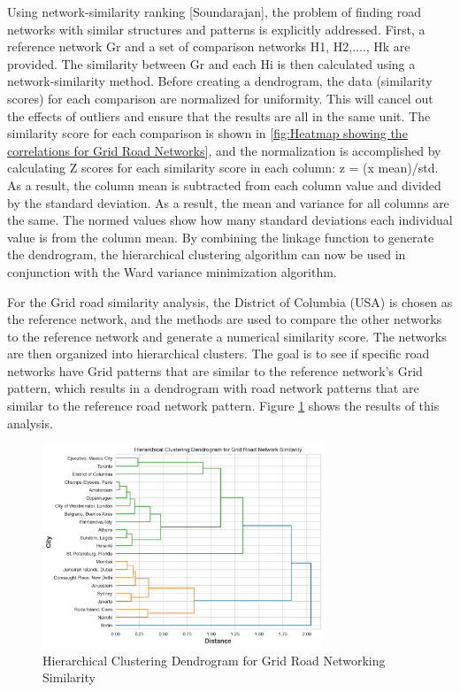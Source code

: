 Using network-similarity ranking [Soundarajan], the problem of finding road networks with similar structures and patterns is explicitly addressed. First, a reference network Gr and a set of comparison networks H1, H2,...., Hk are provided. The similarity between Gr and each Hi is then calculated using a network-similarity method. Before creating a dendrogram, the data (similarity scores) for each comparison are normalized for uniformity. This will cancel out the effects of outliers and ensure that the results are all in the same unit. The similarity score for each comparison is shown in \ref{fig:Heatmap showing the correlations for Grid Road Networks}, and the normalization is accomplished by calculating Z scores for each similarity score in each column: z = (x mean)/std. As a result, the column mean is subtracted from each column value and divided by the standard deviation. As a result, the mean and variance for all columns are the same. The normed values show how many standard deviations each individual value is from the column mean. By combining the linkage function to generate the dendrogram, the hierarchical clustering algorithm can now be used in conjunction with the Ward variance minimization algorithm.

For the Grid road similarity analysis, the District of Columbia (USA) is chosen as the reference network, and the methods are used to compare the other networks to the reference network and generate a numerical similarity score. The networks are then organized into hierarchical clusters. The goal is to see if specific road networks have Grid patterns that are similar to the reference network's Grid pattern, which results in a dendrogram with road network patterns that are similar to the reference road network pattern. Figure \ref{fig:Hierarchical Clustering Dendrogram for Grid Road Networking Similarity} shows the results of this analysis.

\begin{figure}[!ht]
\centering
\includegraphics[width=0.75\textwidth,center]{picture/Grid/grid_dendrogram2.png}
\caption[Hierarchical Clustering Dendrogram for Grid Road Networking Similarity]{Hierarchical Clustering Dendrogram for Grid Road Networking Similarity}
\label{fig:Hierarchical Clustering Dendrogram for Grid Road Networking Similarity}
\end{figure}

